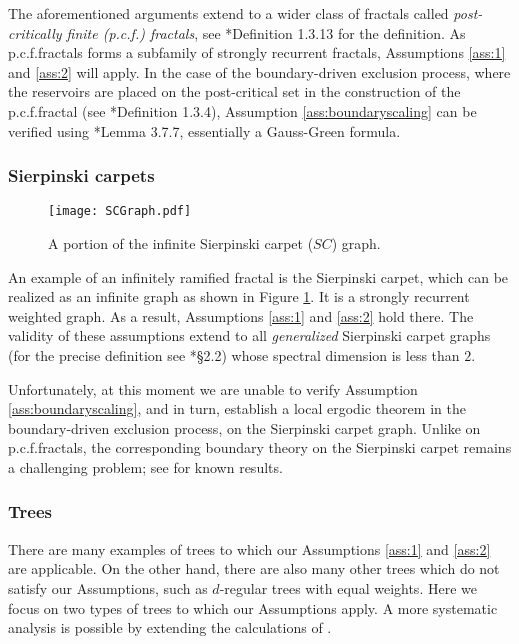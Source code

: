\documentclass[11pt]{amsart}
\theoremstyle{plain}
\theoremstyle{definition}
\theoremstyle{remark}
\begin{document}
The aforementioned arguments extend to a wider class of fractals called \emph{post-critically finite (p.c.f.\@) fractals}, see \cite{Kigami}*{Definition 1.3.13} for the definition. As p.c.f.\@ fractals forms a subfamily of strongly recurrent fractals, Assumptions \ref{ass:1} and \ref{ass:2} will apply. In the case of the boundary-driven exclusion process, where the reservoirs are placed on the post-critical set in the construction of the p.c.f.\@ fractal (see \cite{Kigami}*{Definition 1.3.4}), Assumption \ref{ass:boundaryscaling} can be verified using \cite{Kigami}*{Lemma 3.7.7}, essentially a Gauss-Green formula.



\subsubsection{Sierpinski carpets}

\begin{figure}
\centering
\texttt{[image: SCGraph.pdf]}
\caption{A portion of the infinite Sierpinski carpet ($SC$) graph.}
\label{fig:SCGraph}
\end{figure}

An example of an infinitely ramified fractal is the Sierpinski carpet, which can be realized as an infinite graph as shown in Figure \ref{fig:SCGraph}. It is a strongly recurrent weighted graph. As a result, Assumptions \ref{ass:1} and \ref{ass:2} hold there. The validity of these assumptions extend to all \emph{generalized} Sierpinski carpet graphs (for the precise definition see \cite{BBKT}*{\S2.2}) whose spectral dimension is less than $2$. 

Unfortunately, at this moment we are unable to verify Assumption \ref{ass:boundaryscaling}, and in turn, establish a local ergodic theorem in the boundary-driven exclusion process, on the Sierpinski carpet graph. Unlike on p.c.f.\@ fractals, the corresponding boundary theory on the Sierpinski carpet remains a challenging problem; see \cites{HinoKumagai, BKS13} for known results. 

\subsubsection{Trees}

There are many examples of trees to which our Assumptions \ref{ass:1} and \ref{ass:2} are applicable. On the other hand, there are also many other trees which do not satisfy our Assumptions, such as $d$-regular trees with equal weights. Here we focus on two types of trees to which our Assumptions apply. A more systematic analysis is possible by extending the calculations of \cite{Pearce}.
\end{document}
